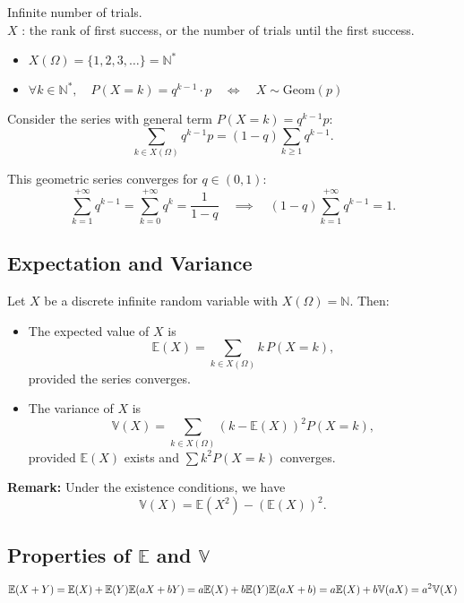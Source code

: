 \documentclass[a4paper,12pt]{article}
\begin{document}
Infinite number of trials.  \\ 

$X$ : the rank of first success, or the number of trials until the first success.

\begin{itemize}
  \item $X(\Omega) = \{1,2,3,\dots\} = \mathbb{N}^*$
  \item $\forall k \in \mathbb{N}^*, \quad P(X = k) = q^{k - 1} \cdot p \quad \Leftrightarrow \quad X \sim \text{Geom}(p)$
\end{itemize}

Consider the series with general term $P(X = k) = q^{k-1} p$:
\[
\sum_{k \in X(\Omega)} q^{k-1} p = (1-q) \sum_{k \ge 1} q^{k-1}.
\]

This geometric series converges for $q \in (0,1)$:
\[
\sum_{k=1}^{+\infty} q^{k-1} = \sum_{k=0}^{+\infty} q^k = \frac{1}{1-q} \quad \implies \quad (1-q) \sum_{k=1}^{+\infty} q^{k-1} = 1.
\]

\subsection*{Expectation and Variance}

Let $X$ be a discrete infinite random variable with $X(\Omega) = \mathbb{N}$. Then:

\begin{itemize}
  \item The expected value of $X$ is
  \[
    \mathbb{E}(X) = \sum_{k \in X(\Omega)} k \, P(X = k),
  \]
  provided the series converges.
  \item The variance of $X$ is
  \[
    \mathbb{V}(X) = \sum_{k \in X(\Omega)} (k - \mathbb{E}(X))^2 P(X = k),
  \]
  provided $\mathbb{E}(X)$ exists and $\sum k^2 P(X=k)$ converges.
\end{itemize}

\textbf{Remark:} Under the existence conditions, we have
\[
\mathbb{V}(X) = \mathbb{E}(X^2) - (\mathbb{E}(X))^2.
\]

\subsection*{Properties of $\mathbb{E}$ and $\mathbb{V}$}



\[
\mathbb{E}(X + Y) = \mathbb{E}(X) + \mathbb{E}(Y) \\
\mathbb{E}(aX + bY) = a\mathbb{E}(X) + b\mathbb{E}(Y) \\
\mathbb{E}(aX + b) = a\mathbb{E}(X) + b \\
\mathbb{V}(aX) = a^2\mathbb{V}(X)\\
\]
\end{document}
